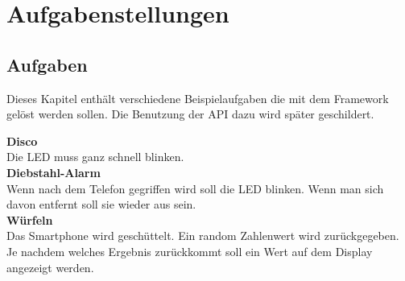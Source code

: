 \documentclass[11pt,a4paper]{report}
\begin{document}

\chapter{Aufgabenstellungen} \label{chap:Experimente}

\section*{Aufgaben}
Dieses Kapitel enthält verschiedene Beispielaufgaben die mit dem Framework gelöst werden sollen.
Die Benutzung der API dazu wird später geschildert.


\textbf{Disco}\\
Die LED muss ganz schnell blinken.
\\

\textbf{Diebstahl-Alarm}\\
Wenn nach dem Telefon gegriffen wird soll die LED blinken.
Wenn man sich davon entfernt soll sie wieder aus sein.
\\

\textbf{Würfeln}\\
Das Smartphone wird geschüttelt.
Ein random Zahlenwert wird zurückgegeben.
Je nachdem welches Ergebnis zurückkommt soll ein Wert auf dem Display angezeigt werden.
\\
\end{document}
